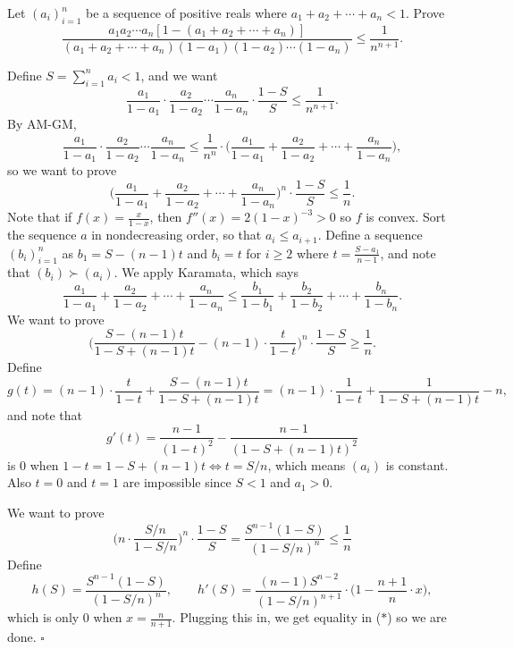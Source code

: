 
\begin{problem}[ISL 1998 A1]
    Let $(a_i)_{i=1}^n$ be a sequence of positive reals where $a_1+a_2+\cdots +a_n<1$. Prove
    \[\frac{a_1 a_2 \cdots a_n [1 - (a_1 + a_2 + \cdots + a_n)]}{(a_1 + a_2 + \cdots + a_n)(1 - a_1)(1 - a_2) \cdots (1 - a_n)} \leq \frac{1}{n^{n+1}}.\]
\end{problem}

\begin{solution}[Ritwin]
    Define $S = \sum_{i=1}^n a_i < 1$, and we want
    \[\frac{a_1}{1-a_1} \cdot \frac{a_2}{1-a_2} \cdots \frac{a_n}{1-a_n} \cdot \frac{1-S}{S} \leq \frac{1}{n^{n+1}}.\]
    By AM-GM,
    \[\frac{a_1}{1-a_1} \cdot \frac{a_2}{1-a_2} \cdots \frac{a_n}{1-a_n} \leq \frac{1}{n^n} \cdot \bigg(\frac{a_1}{1-a_1} + \frac{a_2}{1-a_2} + \cdots + \frac{a_n}{1-a_n}\bigg),\]
    so we want to prove
    \[\bigg(\frac{a_1}{1-a_1} + \frac{a_2}{1-a_2} + \cdots + \frac{a_n}{1-a_n}\bigg)^n \cdot \frac{1-S}{S} \leq \frac1n.\]
    Note that if $f(x) = \tfrac{x}{1-x}$, then $f''(x) = 2(1-x)^{-3} > 0$ so
    $f$ is convex. Sort the sequence $a$ in nondecreasing order, so that
    $a_i \leq a_{i+1}$. Define a sequence $(b_i)_{i=1}^n$ as $b_1 = S-(n-1)t$
    and $b_i = t$ for $i \geq 2$ where $t = \tfrac{S-a_1}{n-1}$, and note that
    $(b_i) \succ (a_i)$. We apply Karamata, which says
    \[\frac{a_1}{1-a_1} + \frac{a_2}{1-a_2} + \cdots + \frac{a_n}{1-a_n} \leq \frac{b_1}{1-b_1} + \frac{b_2}{1-b_2} + \cdots + \frac{b_n}{1-b_n}.\]
    We want to prove
    \[\bigg(\frac{S-(n-1)t}{1-S+(n-1)t} - (n-1) \cdot \frac{t}{1-t}\bigg)^n \cdot \frac{1-S}{S} \geq \frac1n.\]
    Define
    \[g(t) = (n-1) \cdot \frac{t}{1-t} + \frac{S-(n-1)t}{1-S+(n-1)t} = (n-1) \cdot \frac{1}{1-t} + \frac{1}{1-S+(n-1)t} - n,\]
    and note that
    \[g'(t) = \frac{n-1}{(1-t)^2} - \frac{n-1}{(1-S+(n-1)t)^2}\]
    is $0$ when $1-t = 1-S+(n-1)t \Longleftrightarrow t = S/n$, which means $(a_i)$
    is constant. Also $t=0$ and $t=1$ are impossible since $S < 1$ and $a_1 > 0$.
    
    We want to prove
    \[\bigg(n \cdot \frac{S/n}{1-S/n}\bigg)^n \cdot \frac{1-S}{S} = \frac{S^{n-1}(1-S)}{(1-S/n)^n} \leq \frac1n \tag{$*$}\]
    Define
    \[h(S) = \frac{S^{n-1}(1-S)}{(1-S/n)^n}, \qquad h'(S) = \frac{(n-1)S^{n-2}}{(1-S/n)^{n+1}} \cdot \bigg(1 - \frac{n+1}{n} \cdot x\bigg),\]
    which is only $0$ when $x = \tfrac{n}{n+1}$. Plugging this in, we get
    equality in ($*$) so we are done. $\square$
\end{solution}